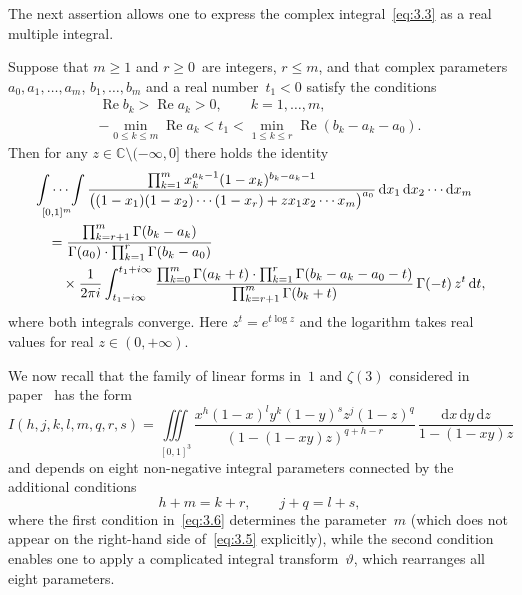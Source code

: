 \documentclass[a4paper,twoside]{article}
\numberwithin{equation}{section}
\renewcommand{\[}{\lfloor}
\renewcommand{\]}{\rfloor}
\newcommand{\<}{\langle}
\renewcommand{\>}{\rangle}
\newcommand{\vt}{\vartheta}
\renewcommand{\d}{\mathrm{d}}
\DeclareMathOperator{\Real}{Re}
\renewcommand{\Re}{\Real}
\newcommand{\rom}[1]{{\rm#1}}
\begin{document}
The next assertion allows one to express the complex integral~\eqref{eq:3.3}
as a real multiple integral.

\begin{proposition}
\label{prop:1}
Suppose that $m\ge1$ and $r\ge0$~are integers\rom, $r\le m$\rom,
and that complex parameters $a_0,a_1,\dots,a_m$\rom, $b_1,\dots,b_m$
and a real number~$t_1<0$ satisfy the conditions
$$
\begin{gathered}
\Re b_k>\Re a_k>0, \qquad k=1,\dots,m,
\\
-\min_{0\le k\le m}\Re a_k<t_1
<\min_{1\le k\le r}\Re(b_k-a_k-a_0).
\end{gathered}
$$
Then for any $z\in\mathbb C\setminus(-\infty,0]$
there holds the identity
\begin{align*}
&
\idotsint\limits_{[0,1]^m}
\frac{\prod_{k=1}^mx_k^{a_k-1}(1-x_k)^{b_k-a_k-1}}
{\bigl((1-x_1)(1-x_2)\dotsb(1-x_r)+zx_1x_2\dotsb x_m\bigr)^{a_0}}
\,\d x_1\,\d x_2\dotsb\d x_m
\\ &\quad
=\frac{\prod_{k=r+1}^m\Gamma(b_k-a_k)}
{\Gamma(a_0)\cdot\prod_{k=1}^r\Gamma(b_k-a_0)}
\\ &\quad\quad\times
\frac1{2\pi i}\int_{t_1-i\infty}^{t_1+i\infty}
\frac{\prod_{k=0}^m\Gamma(a_k+t)
\cdot\prod_{k=1}^r\Gamma(b_k-a_k-a_0-t)}
{\prod_{k=r+1}^m\Gamma(b_k+t)}\,
\Gamma(-t)\,z^t\,\d t,
\end{align*}
where both integrals converge.
Here $z^t=e^{t\log z}$ and the logarithm takes
real values for real $z\in(0,+\infty)$.
\end{proposition}

We now recall that the family of linear forms
in~$1$ and $\zeta(3)$ considered in paper~\cite{RV3}
has the form
\begin{equation}
I(h,j,k,l,m,q,r,s)
=\iiint\limits_{[0,1]^3}
\frac{x^h(1-x)^ly^k(1-y)^sz^j(1-z)^q}{(1-(1-xy)z)^{q+h-r}}\,
\frac{\d x\,\d y\,\d z}{1-(1-xy)z}
\label{eq:3.5}
\end{equation}
and depends on eight non-negative integral parameters
connected by the additional conditions
\begin{equation}
h+m=k+r, \qquad j+q=l+s,
\label{eq:3.6}
\end{equation}
where the first condition in~\eqref{eq:3.6} determines the parameter~$m$
(which does not appear on the right-hand side of~\eqref{eq:3.5} explicitly),
while the second condition enables one to apply a complicated integral
transform~$\vt$, which rearranges all eight parameters.
\end{document}
